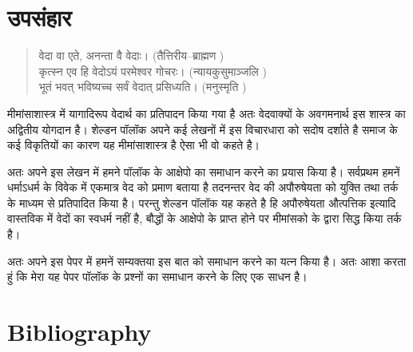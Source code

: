 \section*{उपसंहार}

\begin{verse}
वेदा वा एते, अनन्ता वै वेदाः। (तैत्तिरीय–ब्राह्मण )\\ कृत्स्न एव हि वेदोऽयं परमेश्वर गोचरः। (न्यायकुसुमाञ्जलि )\\ भूतं भवत् भविष्यच्च सर्वं वेदात् प्रसिध्यति। (मनुस्मृति )
\end{verse}

मीमांसाशास्त्र में यागादिरूप वेदार्थ का प्रतिपादन किया गया है अतः वेदवाक्यों के अवगमनार्थ इस शास्त्र का अद्वितीय योगदान है। शेल्डन पॉलॉक अपने कई लेखनों में इस विचारधारा को सदोष दर्शाते है समाज के कई विकृतियों का कारण यह मीमांसाशास्त्र है ऐसा भी वो कहते है।

अतः अपने इस लेखन में हमने पॉलॉक के आक्षेपो का समाधान करने का प्रयास किया है। सर्वप्रथम हमनें धर्माऽधर्म के विवेक में एकमात्र वेद को प्रमाण बताया है तदनन्तर वेद की अपौरुषेयता को युक्ति तथा तर्क के माध्यम से प्रतिपादित किया है। परन्तु शेल्डन पॉलॉक यह कहते है हि अपौरुषेयता औत्पत्तिक इत्यादि वास्तविक में वेदों का स्वधर्म नहीं है, बौद्धों के आक्षेपो के प्राप्त होने पर मीमांसको के द्वारा सिद्ध किया तर्क है। 

अतः अपने इस पेपर में हमनें सम्यक्तया इस बात को समाधान करने का यत्न किया है। अतः आशा करता हुं कि मेरा यह पेपर पॉलॉक के प्रश्नों का समाधान करने के लिए एक साधन है।


\section*{Bibliography}

